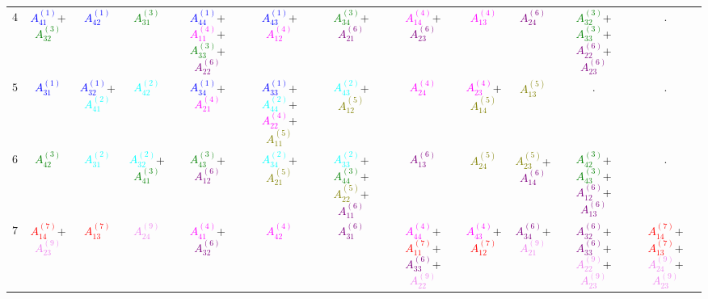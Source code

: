 \documentclass[times,namecite]{goose-article}
\begin{document}
\begin{landscape}
{\begin{tabular}{|c|ccccccccc|cc|}
$4 $& \textcolor{blue}{$A_{41}^{(1)}$}+\textcolor{green}{$A_{32}^{(3)}$} & \textcolor{blue}{$A_{42}^{(1)}$} & \textcolor{green}{$A_{31}^{(3)}$} & \textcolor{blue}{$A_{44}^{(1)}$}+\textcolor{magenta}{$A_{11}^{(4)}$}+\textcolor{green}{$A_{33}^{(3)}$}+\textcolor{purple}{$A_{22}^{(6)}$} & \textcolor{blue}{$A_{43}^{(1)}$}+\textcolor{magenta}{$A_{12}^{(4)}$} & \textcolor{green}{$A_{34}^{(3)}$}+\textcolor{purple}{$A_{21}^{(6)}$} & \textcolor{magenta}{$A_{14}^{(4)}$}+\textcolor{purple}{$A_{23}^{(6)}$} & \textcolor{magenta}{$A_{13}^{(4)}$} & \textcolor{purple}{$A_{24}^{(6)}$} & \textcolor{green}{$A_{32}^{(3)}$}+\textcolor{green}{$A_{33}^{(3)}$}+\textcolor{purple}{$A_{22}^{(6)}$}+\textcolor{purple}{$A_{23}^{(6)}$} & . \\
$5 $& \textcolor{blue}{$A_{31}^{(1)}$} & \textcolor{blue}{$A_{32}^{(1)}$}+\textcolor{cyan}{$A_{41}^{(2)}$} & \textcolor{cyan}{$A_{42}^{(2)}$} & \textcolor{blue}{$A_{34}^{(1)}$}+\textcolor{magenta}{$A_{21}^{(4)}$} & \textcolor{blue}{$A_{33}^{(1)}$}+\textcolor{cyan}{$A_{44}^{(2)}$}+\textcolor{magenta}{$A_{22}^{(4)}$}+\textcolor{olive}{$A_{11}^{(5)}$} & \textcolor{cyan}{$A_{43}^{(2)}$}+\textcolor{olive}{$A_{12}^{(5)}$} & \textcolor{magenta}{$A_{24}^{(4)}$} & \textcolor{magenta}{$A_{23}^{(4)}$}+\textcolor{olive}{$A_{14}^{(5)}$} & \textcolor{olive}{$A_{13}^{(5)}$} & . & . \\
$6 $& \textcolor{green}{$A_{42}^{(3)}$} & \textcolor{cyan}{$A_{31}^{(2)}$} & \textcolor{cyan}{$A_{32}^{(2)}$}+\textcolor{green}{$A_{41}^{(3)}$} & \textcolor{green}{$A_{43}^{(3)}$}+\textcolor{purple}{$A_{12}^{(6)}$} & \textcolor{cyan}{$A_{34}^{(2)}$}+\textcolor{olive}{$A_{21}^{(5)}$} & \textcolor{cyan}{$A_{33}^{(2)}$}+\textcolor{green}{$A_{44}^{(3)}$}+\textcolor{olive}{$A_{22}^{(5)}$}+\textcolor{purple}{$A_{11}^{(6)}$} & \textcolor{purple}{$A_{13}^{(6)}$} & \textcolor{olive}{$A_{24}^{(5)}$} & \textcolor{olive}{$A_{23}^{(5)}$}+\textcolor{purple}{$A_{14}^{(6)}$} & \textcolor{green}{$A_{42}^{(3)}$}+\textcolor{green}{$A_{43}^{(3)}$}+\textcolor{purple}{$A_{12}^{(6)}$}+\textcolor{purple}{$A_{13}^{(6)}$} & . \\
$7 $& \textcolor{red}{$A_{14}^{(7)}$}+\textcolor{violet}{$A_{23}^{(9)}$} & \textcolor{red}{$A_{13}^{(7)}$} & \textcolor{violet}{$A_{24}^{(9)}$} & \textcolor{magenta}{$A_{41}^{(4)}$}+\textcolor{purple}{$A_{32}^{(6)}$} & \textcolor{magenta}{$A_{42}^{(4)}$} & \textcolor{purple}{$A_{31}^{(6)}$} & \textcolor{magenta}{$A_{44}^{(4)}$}+\textcolor{red}{$A_{11}^{(7)}$}+\textcolor{purple}{$A_{33}^{(6)}$}+\textcolor{violet}{$A_{22}^{(9)}$} & \textcolor{magenta}{$A_{43}^{(4)}$}+\textcolor{red}{$A_{12}^{(7)}$} & \textcolor{purple}{$A_{34}^{(6)}$}+\textcolor{violet}{$A_{21}^{(9)}$} & \textcolor{purple}{$A_{32}^{(6)}$}+\textcolor{purple}{$A_{33}^{(6)}$}+\textcolor{violet}{$A_{22}^{(9)}$}+\textcolor{violet}{$A_{23}^{(9)}$} & \textcolor{red}{$A_{14}^{(7)}$}+\textcolor{red}{$A_{13}^{(7)}$}+\textcolor{violet}{$A_{24}^{(9)}$}+\textcolor{violet}{$A_{23}^{(9)}$} \\

\end{tabular}}
\end{landscape}
\end{document}
